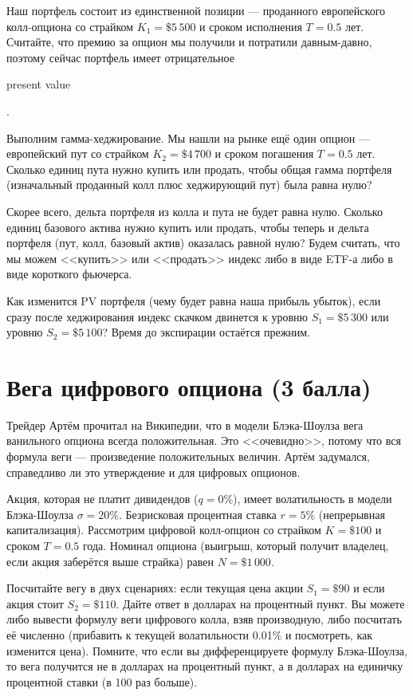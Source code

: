 \documentclass[a4paper,14pt]{extarticle}
\newcommand{\en}[1]{\begin{otherlanguage}{english}#1\end{otherlanguage}}
\begin{document}
Наш портфель состоит из единственной позиции --- проданного европейского колл-опциона со страйком $K_1=\$5\,500$ и сроком исполнения $T=0.5$ лет. Считайте, что премию за опцион мы получили и потратили давным-давно, поэтому сейчас портфель имеет отрицательное \en{present value}.

Выполним гамма-хеджирование. Мы нашли на рынке ещё один опцион --- европейский пут со страйком $K_2=\$4\,700$ и сроком погашения $T=0.5$ лет. Сколько единиц пута нужно купить или продать, чтобы общая гамма портфеля (изначальный проданный колл плюс хеджирующий пут) была равна нулю?

Скорее всего, дельта портфеля из колла и пута не будет равна нулю. Сколько единиц базового актива нужно купить или продать, чтобы теперь и дельта портфеля (пут, колл, базовый актив) оказалась равной нулю? Будем считать, что мы можем <<купить>> или <<продать>> индекс либо в виде ETF-а либо в виде короткого фьючерса.

Как изменится PV портфеля (чему будет равна наша прибыль убыток), если сразу после хеджирования индекс скачком двинется к уровню $S_1=\$5\,300$ или уровню $S_2=\$5\,100$? Время до экспирации остаётся прежним.

\section{Вега цифрового опциона (3 балла)}

Трейдер Артём прочитал на Википедии, что в модели Блэка-Шоулза вега ванильного опциона всегда положительная. Это <<очевидно>>, потому что вся формула веги --- произведение положительных величин. Артём задумался, справедливо ли это утверждение и для цифровых опционов.

Акция, которая не платит дивидендов ($q=0\%$), имеет волатильность в модели Блэка-Шоулза $\sigma=20\%$. Безрисковая процентная ставка $r=5\%$ (непрерывная капитализация). Рассмотрим цифровой колл-опцион со страйком $K=\$100$ и сроком $T=0.5$ года. Номинал опциона (выигрыш, который получит владелец, если акция заберётся выше страйка) равен $N=\$1\,000$.

Посчитайте вегу в двух сценариях: если текущая цена акции $S_1=\$90$ и если акция стоит $S_2=\$110$. Дайте ответ в долларах на процентный пункт. Вы можете либо вывести формулу веги цифрового колла, взяв производную, либо посчитать её численно (прибавить к текущей волатильности 0.01\% и посмотреть, как изменится цена). Помните, что если вы дифференцируете формулу Блэка-Шоулза, то вега получится не в долларах на процентный пункт, а в долларах на единичку процентной ставки (в 100 раз больше).
\end{document}
